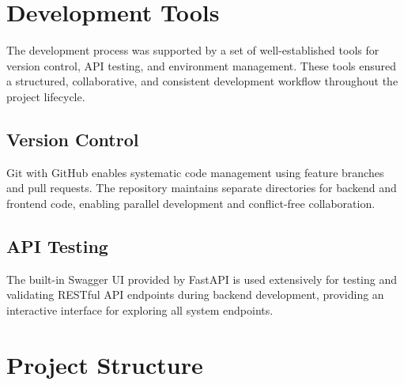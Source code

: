 \section{Development Tools}
\label{sec:dev-tools}

The development process was supported by a set of 
well-established tools for version control, API testing, and 
environment management. These tools ensured a structured, 
collaborative, and consistent development workflow throughout 
the project lifecycle.

\subsection{Version Control}
\label{subsec:version-control}

Git with GitHub enables systematic code management using feature 
branches and pull requests. The repository maintains separate 
directories for backend and frontend code, enabling parallel 
development and conflict-free 
collaboration.

\subsection{API Testing}
\label{subsec:api-testing}

The built-in Swagger UI provided by FastAPI is used extensively for 
testing and validating RESTful API endpoints during backend 
development, providing an interactive interface for exploring all system 
endpoints.

\section{Project Structure}
\label{sec:project-structure}

